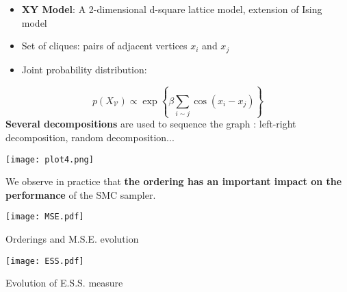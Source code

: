 \documentclass[portrait,final,a0paper,fontscale=0.277]{baposter}
\begin{document}
\begin{poster}
{\begin{multicols}{2}
\begin{itemize}
    \item \textbf{XY Model}: A 2-dimensional d-square lattice model, extension of Ising model
    \item Set of cliques: pairs of adjacent vertices $x_i$ and $x_j$
    \item Joint probability distribution:
\end{itemize}
$$
p(X_{\mathcal{V}})  \propto \exp\left\{ \beta \displaystyle\sum_{i \sim j} \cos(x_i-x_j)   \right\}
$$
\textbf{Several decompositions} are used to sequence the graph :  left-right decomposition, random decomposition...
\begin{center}
\texttt{[image: plot4.png]}
\end{center}


\noindent We observe in practice that \textbf{the ordering has an important impact on the performance} of the SMC sampler.

\columnbreak




\begin{center}
\texttt{[image: MSE.pdf]}

Orderings and M.S.E. evolution
\end{center}
\begin{center}
\texttt{[image: ESS.pdf]}

Evolution of E.S.S. measure 


\end{center}
\end{multicols}}
\end{poster}
\end{document}
